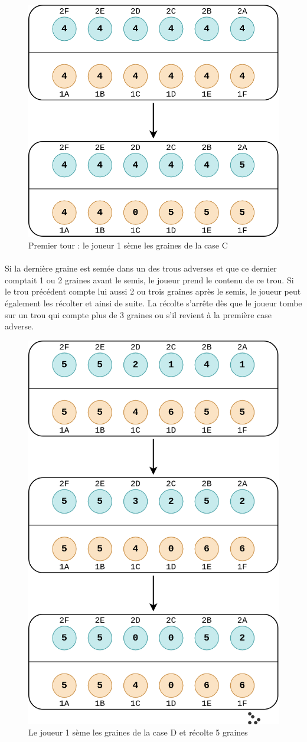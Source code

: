 \documentclass{article}
\begin{document}
    \begin{figure}[H]
        \centering
        \includegraphics[width=.55\linewidth]{./images/tour1.png}
        \caption{Premier tour : le joueur 1 sème les graines de la case C}
    \end{figure}

    \paragraph{}
    Si la dernière graine est semée dans un des trous adverses et que ce dernier comptait 1 ou 2 graines avant le semis, le joueur prend le contenu de ce trou. Si le trou précédent compte lui aussi 2 ou trois graines après le semis, le joueur peut également les récolter et ainsi de suite. La récolte s'arrête dès que le joueur tombe sur un trou qui compte plus de 3 graines ou s'il revient à la première case adverse.

    \begin{figure}[H]
        \centering
        \includegraphics[width=.55\linewidth]{./images/recolte1.png}
        \caption{Le joueur 1 sème les graines de la case D et récolte 5 graines}
    \end{figure}
    
\end{document}
